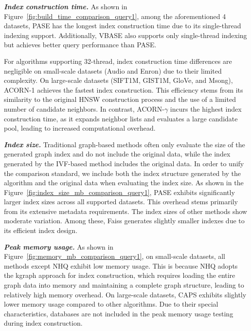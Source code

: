 \documentclass[sigconf, nonacm]{acmart}
\begin{document}
	\textit{\textbf{Index construction time.}}
	As shown in Figure~\ref{fig:build_time_comparison_query1}, among the aforementioned 4 datasets, PASE has the longest index construction time due to its single-thread indexing support. Additionally, VBASE also supports only single-thread indexing but achieves better query performance than PASE.
	
	For algorithms supporting 32-thread, index construction time differences are negligible on small-scale datasets (Audio and Enron) due to their limited complexity. On large-scale datasets (SIFT1M, GIST1M, GloVe, and Msong), ACORN-1 achieves the fastest index construction. This efficiency stems from its similarity to the original HNSW construction process and the use of a limited number of candidate neighbors. In contrast, ACORN-$\gamma$ incurs the highest index construction time, as it expands neighbor lists and evaluates a large candidate pool, leading to increased computational overhead.
	
	
	\textit{\textbf{Index size.}}
	Traditional graph-based methods often only evaluate the size of the generated graph index and do not include the original data, while the index generated by the IVF-based method includes the original data. In order to unify the comparison standard, 
	we include both the index structure generated by the algorithm and the original data when evaluating the index size. 
	As shown in the Figure~\ref{fig:index_size_mb_comparison_query1}, PASE exhibits significantly larger index sizes across all supported datasets. This overhead stems primarily from its extensive metadata requirements. The index sizes of other methods show moderate variation. Among these, Faiss generates slightly smaller indexes due to its efficient index design.
	
	
	
	\textit{\textbf{Peak memory usage.}}
	As shown in Figure~\ref{fig:memory_mb_comparison_query1}, on small-scale datasets, all methods except NHQ exhibit low memory usage. This is because NHQ adopts the kgraph approach for index construction, which requires loading the entire graph data into memory and maintaining a complete graph structure, leading to relatively high memory overhead. On large-scale datasets, CAPS exhibits slightly lower memory usage compared to other algorithms. Due to their special characteristics, databases are not included in the peak memory usage testing during index construction.
	
\end{document}
